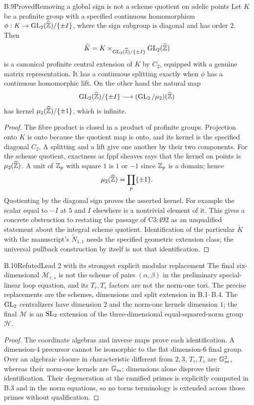 \begin{statement}{B.9}{Proved}{Removing a global sign is not a scheme quotient on adelic points}
Let $K$ be a profinite group with a specified continuous
homomorphism $\phi:K\to\operatorname{GL}_2(\widehat{\mathbb Z})/\{\pm I\}$,
where the sign subgroup is diagonal and has order $2$.
Then
\[
 \widetilde K=K\times_{\operatorname{GL}_2(\widehat{\mathbb Z})/\{\pm I\}}
                  \operatorname{GL}_2(\widehat{\mathbb Z})
\]
is a canonical profinite central extension of $K$ by $C_2$,
equipped with a genuine matrix representation. It has a
continuous splitting exactly when $\phi$ has a continuous
homomorphic lift. On the other hand the natural map
\[
 \operatorname{GL}_2(\widehat{\mathbb Z})/\{\pm I\}\longrightarrow
       (\operatorname{GL}_2/\mu_2)(\widehat{\mathbb Z})
\]
has kernel $\mu_2(\widehat{\mathbb Z})/\{\pm1\}$, which is infinite.
\end{statement}
\begin{proof}
The fibre product is closed in a product of profinite
groups. Projection onto $K$ is onto because the quotient
map is onto, and its kernel is the specified diagonal
$C_2$. A splitting and a lift give one another by their
two components. For the scheme quotient, exactness as
fppf sheaves says that the kernel on points is
$\mu_2(\widehat{\mathbb Z})$. A unit of $\mathbb Z_p$ with square $1$
is $1$ or $-1$ since $\mathbb Z_p$ is a domain; hence
\[
 \mu_2(\widehat{\mathbb Z})=\prod_p\{\pm1\}.
\]
Quotienting by the diagonal sign proves the asserted
kernel. For example the scalar equal to $-I$ at $5$ and
$I$ elsewhere is a nontrivial element of it. This gives
a concrete obstruction to restating the passage of
C3:492 as an unqualified statement about the integral
scheme quotient. Identification of the particular
$\widetilde K$ with the manuscript's
$\widetilde N_{1,1}$ needs the specified geometric
extension class; the universal pullback construction by
itself is not that identification.
\end{proof}

\begin{statement}{B.10}{Refuted}{Lead 2 with its strongest explicit modular replacement}
The final six-dimensional $\mathcal M_{r,s}$ is not the
scheme of pairs $(\alpha,\beta)$ in the preliminary
special-linear loop equation, and its $T_r,T_s$ factors
are not the norm-one tori. The precise replacements are
the schemes, dimensions and split extension in B.1--B.4.
The $\operatorname{GL}_2$ centralizers have dimension $2$ and the
norm-one kernels dimension $1$; the final $\mathcal M$
is an $\operatorname{SL}_2$ extension of the three-dimensional
equal-squared-norm group $\mathcal H$.
\end{statement}
\begin{proof}
The coordinate algebras and inverse maps prove each
identification. A dimension-$4$ precursor cannot be
isomorphic to the flat dimension-$6$ final group.
Over an algebraic closure in characteristic different
from $2,3$, $T_r,T_s$ are $\mathbb G_m^2$, whereas their
norm-one kernels are $\mathbb G_m$; dimensions alone disprove
their identification. Their degeneration at the
ramified primes is explicitly computed in B.3 and in
the norm equations, so no torus terminology is extended
across those primes without qualification.
\end{proof}


